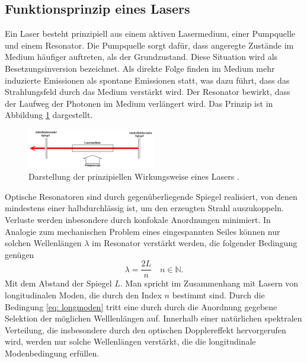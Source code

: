 \subsection{Funktionsprinzip eines Lasers}
Ein Laser besteht prinzipiell aus einem aktiven Lasermedium, einer Pumpquelle und einem Resonator. Die Pumpquelle sorgt dafür, dass
angeregte Zustände im Medium häufiger auftreten, als der Grundzustand. Diese Situation wird als Besetzungsinversion bezeichnet. Als direkte
Folge finden im Medium mehr induzierte Emissionen als spontane Emissionen statt, was dazu führt, dass das Strahlungsfeld durch das Medium verstärkt wird.
Der Resonator bewirkt, dass der Laufweg der Photonen im Medium verlängert wird. Das Prinzip ist in Abbildung \ref{fig: prinzip_laser} dargestellt.
\begin{figure}
  \centering
  \includegraphics[width = 0.5\textwidth]{theorie_bilder/prinzip_laser.png}
  \caption{Darstellung der prinzipiellen Wirkungsweise eines Lasers \cite{anleitung61}.}
  \label{fig: prinzip_laser}
\end{figure}

Optische Resonatoren sind durch gegenüberliegende Spiegel realisiert, von denen mindestens einer halbdurchlässig ist, um den erzeugten Strahl
auszukoppeln. Verluste werden inbesondere durch konfokale Anordnungen minimiert.
In Analogie zum mechanischen Problem eines eingespannten Seiles können nur solchen Wellenlängen $\lambda$ im Resonator verstärkt werden, die
folgender Bedingung genügen
\begin{equation}
  \lambda = \frac{2 L }{n} \quad n \in  \mathbb{N}.
  \label{eq: longmoden}
\end{equation}
Mit dem Abstand der Spiegel $L$. Man spricht im Zusammenhang mit Lasern von longitudinalen Moden, die durch den Index $n$ bestimmt sind.
Durch die Bedingung \eqref{eq: longmoden} tritt eine durch durch die Anordnung gegebene Selektion der möglichen Welllenlängen auf. Innerhalb
einer natürlichen spektralen Verteilung, die insbesondere durch den optischen Dopplereffekt hervorgerufen wird, werden nur solche Wellenlängen
verstärkt, die die longitudinale Modenbedingung erfüllen.

